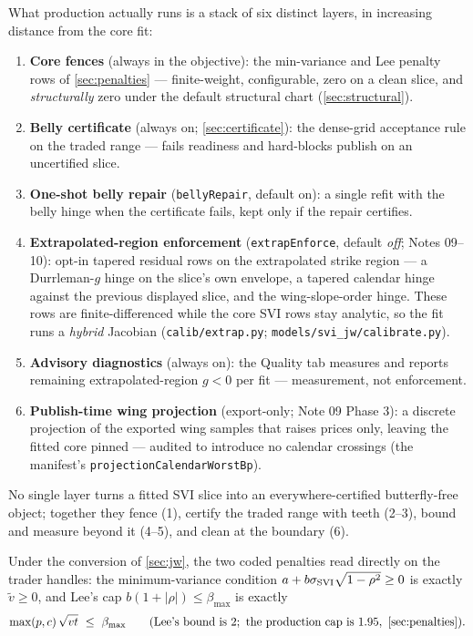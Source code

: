 \documentclass[11pt]{article}
\begin{document}
What production actually runs is a stack of six distinct layers, in
increasing distance from the core fit:
\begin{enumerate}[leftmargin=1.6em]
\item \textbf{Core fences} (always in the objective): the min-variance and
Lee penalty rows of \cref{sec:penalties} --- finite-weight, configurable,
zero on a clean slice, and \emph{structurally} zero under the default
structural chart (\cref{sec:structural}).
\item \textbf{Belly certificate} (always on; \cref{sec:certificate}): the
dense-grid acceptance rule on the traded range --- fails readiness and
hard-blocks publish on an uncertified slice.
\item \textbf{One-shot belly repair} (\texttt{bellyRepair}, default on): a
single refit with the belly hinge when the certificate fails, kept only if
the repair certifies.
\item \textbf{Extrapolated-region enforcement} (\texttt{extrapEnforce},
default \emph{off}; Notes 09--10): opt-in tapered residual rows on the
extrapolated strike region --- a Durrleman-$g$ hinge on the slice's own
envelope, a tapered calendar hinge against the previous displayed slice, and
the wing-slope-order hinge. These rows are finite-differenced while the core
SVI rows stay analytic, so the fit runs a \emph{hybrid} Jacobian
(\texttt{calib/extrap.py}; \texttt{models/svi\_jw/calibrate.py}).
\item \textbf{Advisory diagnostics} (always on): the Quality tab measures and
reports remaining extrapolated-region $g<0$ per fit --- measurement, not
enforcement.
\item \textbf{Publish-time wing projection} (export-only; Note 09 Phase 3): a
discrete projection of the exported wing samples that raises prices only,
leaving the fitted core pinned --- audited to introduce no calendar
crossings (the manifest's \texttt{projectionCalendarWorstBp}).
\end{enumerate}
No single layer turns a fitted SVI slice into an everywhere-certified
butterfly-free object; together they fence (1), certify the traded range with
teeth (2--3), bound and measure beyond it (4--5), and clean at the boundary
(6).

\begin{proposition}
\label{prop:jwnoarb}
Under the conversion of \cref{sec:jw}, the two coded penalties read directly
on the trader handles: the minimum-variance condition
$a+b\sigma_{\mathrm{SVI}}\sqrt{1-\rho^2}\ge0$ is exactly $\widetilde v\ge0$, and Lee's cap
$b(1+|\rho|)\le\beta_{\max}$ is exactly
\[
\max(p,c)\,\sqrt{vt}\ \le\ \beta_{\max}
\qquad(\text{Lee's bound is }2;\ \text{the production cap is }\svileemax,
\ \cref{sec:penalties}).
\]
\end{proposition}
\end{document}
